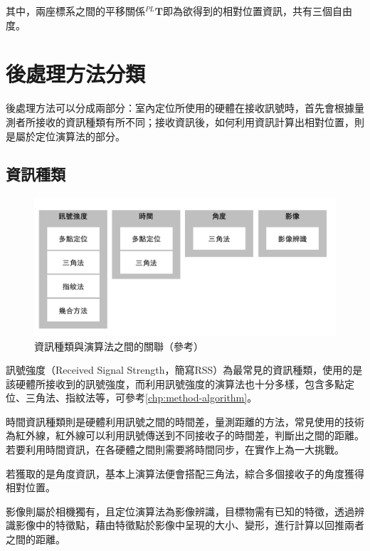     
    
   其中，兩座標系之間的平移關係$^{PL}\boldsymbol{T}$即為欲得到的相對位置資訊，共有三個自由度。

 



\section{後處理方法分類}
\label{chp:method}
    
    後處理方法可以分成兩部分：室內定位所使用的硬體在接收訊號時，首先會根據量測者所接收的資訊種類有所不同；接收資訊後，如何利用資訊計算出相對位置，則是屬於定位演算法的部分。
    
    

    \subsection{資訊種類}
    
    \begin{figure}[ht]
        \centering
        \includegraphics[width=12cm]{ch2pic/method_sort.png}
        \caption{資訊種類與演算法之間的關聯（參考\cite{survey_light2018}）}
        \label{pic:method_sort}
    \end{figure}

    訊號強度（Received Signal Strength，簡寫RSS）為最常見的資訊種類，使用的是該硬體所接收到的訊號強度，而利用訊號強度的演算法也十分多樣，包含多點定位、三角法、指紋法等，可參考\ref{chp:method-algorithm}。

    時間資訊種類則是硬體利用訊號之間的時間差，量測距離的方法，常見使用的技術為紅外線，紅外線可以利用訊號傳送到不同接收子的時間差，判斷出之間的距離。若要利用時間資訊，在各硬體之間則需要將時間同步，在實作上為一大挑戰。

    若獲取的是角度資訊，基本上演算法便會搭配三角法，綜合多個接收子的角度獲得相對位置。

    影像則屬於相機獨有，且定位演算法為影像辨識，目標物需有已知的特徵，透過辨識影像中的特徵點，藉由特徵點於影像中呈現的大小、變形，進行計算以回推兩者之間的距離。



